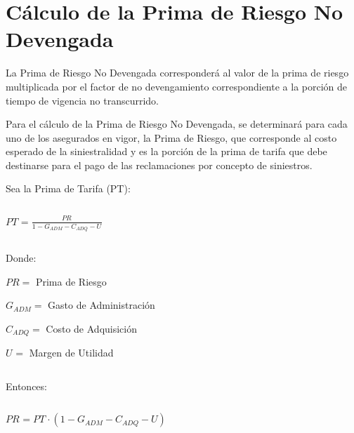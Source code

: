 \documentclass[11pt,twoside,openright,spanish]{report}
\numberwithin{equation}{chapter}
\numberwithin{figure}{chapter}
\numberwithin{table}{chapter}
\begin{document}
	 

$ $

 
	
	\section{Cálculo de la Prima de Riesgo No Devengada}
	 
	
	La Prima de Riesgo No Devengada corresponderá al valor de la prima de riesgo multiplicada por el factor de no devengamiento correspondiente a la porción de tiempo de vigencia no transcurrido.
	
	 
	
	Para el cálculo de la Prima de Riesgo No Devengada, se determinará para cada uno de los asegurados en vigor, la Prima de Riesgo, que corresponde al costo esperado de la siniestralidad y es la porción de la prima de tarifa que debe destinarse para el pago de las reclamaciones por concepto de siniestros.
	
	 
	
	Sea la Prima de Tarifa (PT):
	
	 

$ $

 
	
		{\centering
		${PT}_{}^{}=\frac{{PR}_{}^{}}{{1}_{}-{}G_{ADM}-{C}_{ADQ}-{U}_{}}$
		\noindent
		
	}	
	
	
	 

$ $

 
	
	Donde:
	
	 
	
	 $PR=$ Prima de Riesgo
	
	$G_{ADM}^{}=$ Gasto de Administración
	
	$C_{ADQ}^{}=$ Costo de Adquisición
	
	$U_{}^{}=$ Margen de Utilidad
	
	 

$ $

 
	
	Entonces:
	
	 

$ $

 
	
		{\centering
		${PR}_{}^{}={{PT}_{}\cdot(1-G_{ADM}-C_{ADQ}-U)}$
		\noindent
		
	}	
	
	
	 

$ $

 
	
\end{document}
